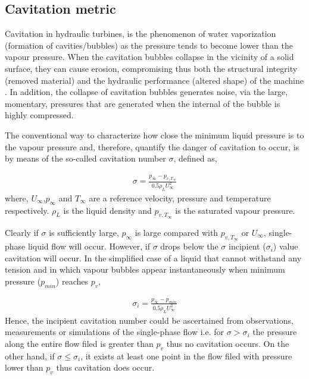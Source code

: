 \subsection{Cavitation metric}
\label{cav.metric}
Cavitation in hydraulic turbines, is the phenomenon of water vaporization (formation of cavities/bubbles) as the pressure tends to become lower than the vapour pressure. When the cavitation bubbles collapse in the vicinity of a solid surface, they can cause erosion, compromising thus both the structural integrity (removed material) and the hydraulic performance (altered shape) of the machine \cite{thiruvengadam1974handbook,knapp1970cavitation,brennen1995cavitation}.  In addition, the collapse of cavitation bubbles generates noise, via the large, momentary, pressures that are generated when the internal of the bubble is highly compressed.

The conventional way to characterize how close the minimum liquid pressure is to the vapour pressure and, therefore, quantify the danger of cavitation to occur, is by means of the so-called cavitation number $\sigma$, defined as,

\begin{eqnarray}
		\sigma=\frac{p_{\infty}-p_{v,T_{\infty}}}{0.5\rho_{L}U^2_{\infty}}
\label{Cavi}
\end{eqnarray}
where, $U_{\infty}$,$p_{\infty}$ and $T_{\infty}$ are a reference velocity, pressure and temperature respectively. $\rho_{L}$ is the liquid density and $p_{v,T_{\infty}}$  is the saturated vapour pressure. 

Clearly if $\sigma$ is sufficiently large, $p_{\infty}$ is large compared with $p_{v,T_{\infty}}$ or $U_{\infty}$, single-phase liquid flow will occur. However, if $\sigma$ drops below the $\sigma$ incipient ($\sigma_i$) value cavitation will occur. In the simplified case of a liquid that cannot withstand any tension and in which vapour bubbles appear instantaneously when minimum pressure ($p_{min}$) reaches $p_{v}$,

\begin{eqnarray}
		\sigma_i=\frac{p_{\infty}-p_{min}}{0.5\rho_{L}U^2_{\infty}}
\label{Cavi2}
\end{eqnarray}
Hence, the incipient cavitation number could be ascertained from observations, measurements or simulations of the single-phase flow i.e. for $\sigma > \sigma_i$ the pressure along the entire flow filed is greater than $p_v$ thus no cavitation occurs. On the other hand, if $\sigma \leq \sigma_i$, it exists at least one point in the flow filed with pressure lower than $p_v$ thus cavitation does occur. 


